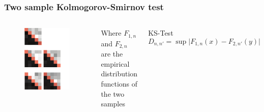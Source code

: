 \documentclass[9pt]{beamer}
\begin{document}
	\begin{frame}
			\frametitle{Two sample Kolmogorov-Smirnov test}				
				\begin{columns}
					\begin{figure}
					\vspace*{-2cm}	
							\includegraphics[scale=0.7]{ks2}
					\end{figure}
Where $F_{1,n}$ and $F_{2,n}$ are the empirical distribution functions of the two samples 
\begin{block}{KS-Test} 
\[  D_{n,n'} = \sup \vert F_{1,n}(x)-F_{2,n'}(y) \vert  \] 


\end{block}
\end{columns}
\end{frame}
\end{document}
